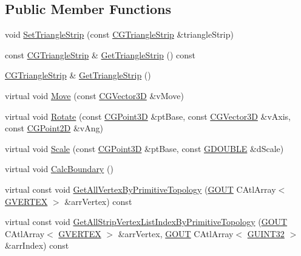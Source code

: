 \subsection*{Public Member Functions}
\begin{DoxyCompactItemize}
\item 
void \hyperlink{class_c_g_object_triangle_strip_abbbc80c8bf4f87201a7927a0d590774a}{Set\+Triangle\+Strip} (const \hyperlink{class_c_g_triangle_strip}{C\+G\+Triangle\+Strip} \&triangle\+Strip)
\item 
const \hyperlink{class_c_g_triangle_strip}{C\+G\+Triangle\+Strip} \& \hyperlink{class_c_g_object_triangle_strip_a54b8b13e2e4436ad0cd6e01ad6a93013}{Get\+Triangle\+Strip} () const 
\item 
\hyperlink{class_c_g_triangle_strip}{C\+G\+Triangle\+Strip} \& \hyperlink{class_c_g_object_triangle_strip_ab2cc0c7c4d071ac95865cea731e954c2}{Get\+Triangle\+Strip} ()
\item 
virtual void \hyperlink{class_c_g_object_triangle_strip_aa76d287087b12c67299c1cefe46034f5}{Move} (const \hyperlink{_g_point3_d_8h_aa7e73d39f4c991acb5a13c84b498366d}{C\+G\+Vector3\+D} \&v\+Move)
\item 
virtual void \hyperlink{class_c_g_object_triangle_strip_a7147a53ba5f132e161202319afc18a49}{Rotate} (const \hyperlink{class_c_g_point3_d}{C\+G\+Point3\+D} \&pt\+Base, const \hyperlink{_g_point3_d_8h_aa7e73d39f4c991acb5a13c84b498366d}{C\+G\+Vector3\+D} \&v\+Axis, const \hyperlink{class_c_g_point2_d}{C\+G\+Point2\+D} \&v\+Ang)
\item 
virtual void \hyperlink{class_c_g_object_triangle_strip_ad2ad0bef9dcb43d15d8901b99b467642}{Scale} (const \hyperlink{class_c_g_point3_d}{C\+G\+Point3\+D} \&pt\+Base, const \hyperlink{_g_types_8h_afd05ac85f90ee8e2a733928545462cd4}{G\+D\+O\+U\+B\+L\+E} \&d\+Scale)
\item 
virtual void \hyperlink{class_c_g_object_triangle_strip_ac275e0a67172c1458c3dc3ec750a521f}{Calc\+Boundary} ()
\item 
virtual const void \hyperlink{class_c_g_object_triangle_strip_a6f0122d60be6e632c880e19340efe2e2}{Get\+All\+Vertex\+By\+Primitive\+Topology} (\hyperlink{_g_types_8h_a0858ec221262e635612871d70ca233ad}{G\+O\+U\+T} C\+Atl\+Array$<$ \hyperlink{struct_g_v_e_r_t_e_x}{G\+V\+E\+R\+T\+E\+X} $>$ \&arr\+Vertex) const 
\item 
virtual const void \hyperlink{class_c_g_object_triangle_strip_ac5744b4bfe774027cf679c1107009d38}{Get\+All\+Strip\+Vertex\+List\+Index\+By\+Primitive\+Topology} (\hyperlink{_g_types_8h_a0858ec221262e635612871d70ca233ad}{G\+O\+U\+T} C\+Atl\+Array$<$ \hyperlink{struct_g_v_e_r_t_e_x}{G\+V\+E\+R\+T\+E\+X} $>$ \&arr\+Vertex, \hyperlink{_g_types_8h_a0858ec221262e635612871d70ca233ad}{G\+O\+U\+T} C\+Atl\+Array$<$ \hyperlink{_g_types_8h_a2e1a1c77d1349057202e2f34e071019c}{G\+U\+I\+N\+T32} $>$ \&arr\+Index) const 

\end{DoxyCompactItemize}
